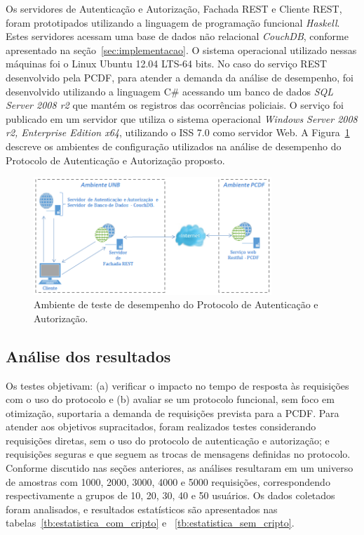Os servidores de Autenticação e Autorização, Fachada REST e Cliente REST, foram prototipados utilizando a linguagem de programação funcional \emph{Haskell}. Estes servidores acessam uma base de dados não relacional \emph{CouchDB}, conforme apresentado na seção~\ref{sec:implementacao}.
O sistema operacional utilizado nessas máquinas foi o Linux Ubuntu 12.04 LTS-64 bits. No caso do serviço REST desenvolvido pela PCDF,
para atender a demanda da análise de desempenho, foi desenvolvido utilizando a linguagem C\# acessando um banco de dados \emph{SQL Server 2008 r2} que mant\'{e}m os registros das ocorr\^{e}ncias policiais. O serviço foi publicado em um servidor que utiliza o sistema operacional
\emph{Windows Server 2008 r2, Enterprise Edition x64}, utilizando o ISS 7.0 como servidor Web.
A Figura~\ref{fig:ambiente_teste} descreve os ambientes de configuração utilizados na análise de desempenho do Protocolo de Autenticação e Autorização proposto.


\begin{figure}[!htb]
\centering
\includegraphics[width=0.8\textwidth]{ambiente_teste_desempenho.png}
\caption{Ambiente de teste de desempenho do Protocolo de Autenticação e Autorização.}
\label{fig:ambiente_teste}
\end{figure}

\subsection{Análise dos resultados}\label{sec:analise_resultados}

Os testes objetivam: (a) verificar o impacto no tempo de resposta às requisições com o uso do protocolo e (b) avaliar se um protocolo funcional, sem foco em otimização, suportaria a demanda de requisi\c c\~{o}es prevista para a PCDF. Para atender aos objetivos supracitados, foram realizados testes considerando requisi\c c\~{o}es diretas, sem o uso do protocolo de autentica\c c\~{a}o e autoriza\c c\~{a}o; e requisi\c c\~{o}es seguras e que seguem as trocas de mensagens definidas no protocolo. Conforme discutido nas se\c c\~{o}es anteriores, as an\'{a}lises resultaram em um universo de amostras com 1000, 2000, 3000, 4000 e 5000 requisi\c c\~{o}es, correspondendo respectivamente a grupos de 10, 20, 30, 40 e 50 usuários.
Os dados coletados foram analisados, e resultados estatísticos são apresentados nas  tabelas~\ref{tb:estatistica_com_cripto} e ~\ref{tb:estatistica_sem_cripto}.

